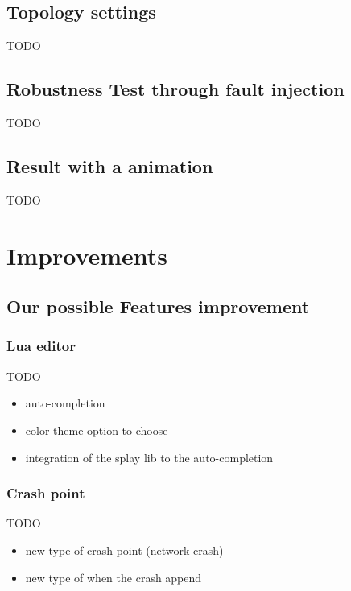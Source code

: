\documentclass{eplmastersthesis}
\begin{document}
    \section{Topology settings}

    {\color{red} TODO}

    \section{Robustness Test through fault injection}


    {\color{red} TODO}

    \section{Result with a animation}
    {\color{red} TODO}

  \chapter{Improvements}

    \section{Our possible Features improvement}

      \subsection{Lua editor}
      {\color{red} TODO}
      \begin{itemize}
        \item auto-completion
        \item color theme option to choose
        \item integration of the splay lib to the auto-completion
      \end{itemize}

      \subsection{Crash point}
      {\color{red} TODO}
      \begin{itemize}
        \item new type of crash point (network crash)
        \item new type of when the crash append
      \end{itemize}
\end{document}
